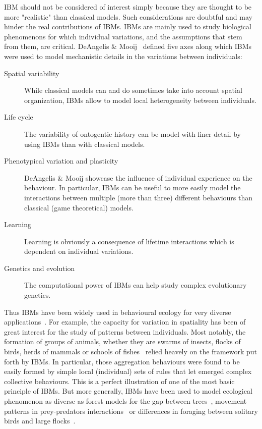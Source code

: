     IBM should not be considered of interest simply because they are thought to be more "realistic" than classical models. Such considerations are doubtful and may hinder the real contributions of IBMs. IBMs are mainly used to study biological phenomenons for which individual variations, and the assumptions that stem from them, are critical. DeAngelis \& Mooij~\parencite{DeAngelis2005} defined five axes along which IBMs were used to model mechanistic details in the variations between individuals:

    \begin{description}
        \item[Spatial variability] {While classical models can and do sometimes take into account spatial organization, IBMs allow to model local heterogeneity between individuals.}
        \item[Life cycle] {The variability of ontogentic history can be model with finer detail by using IBMs than with classical models.}
        \item[Phenotypical variation and plasticity] {DeAngelis \& Mooij showcase the influence of individual experience on the behaviour. In particular, IBMs can be useful to more easily model the interactions between multiple (more than three) different behaviours than classical (game theoretical) models.}
        \item[Learning] {Learning is obviously a consequence of lifetime interactions which is dependent on individual variations.}
        \item[Genetics and evolution] {The computational power of IBMs can help study complex evolutionary genetics.}
    \end{description}

    Thus IBMs have been widely used in behavioural ecology for very diverse applications~\parencite{DeAngelis2005}. For example, the capacity for variation in spatiality has been of great interest for the study of patterns between individuals. Most notably, the formation of groups of animals, whether they are swarms of insects, flocks of birds, herds of mammals or schools of fishes~\parencite{Huth1992, Gueron1996, Couzin2002} relied heavely on the framework put forth by IBMs. In particular, those aggregation behaviours were found to be easily formed by simple local (individual) sets of rules that let emerged complex collective behaviours. This is a perfect illustration of one of the most basic principle of IBMs. But more generally, IBMs have been used to model ecological phenomenon as diverse as forest models for the gap between trees~\parencite{Botkin1972}, movement patterns in prey-predators interactions~\parencite{Smith1991} or differences in foraging between solitary birds and large flocks~\parencite{Toquenaga1995}.

